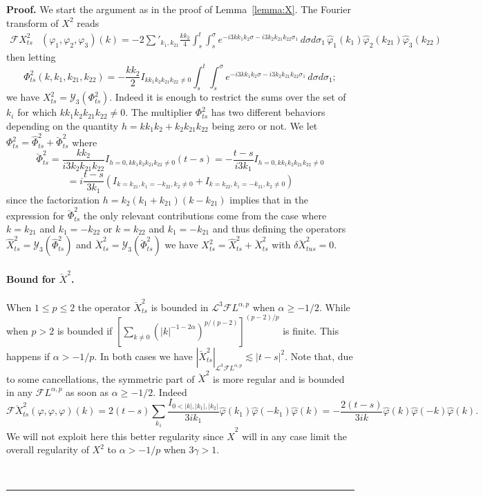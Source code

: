 \documentclass[a4paper,11pt,reqno]{article}
\newcommand{\der}{\delta}
\newcommand{\FF}{\mathcal{F}}
\newcommand{\LL}{\mathcal{L}}
\newcommand{\YY}{\mathcal{Y}}
\newcommand{\wh}{\widehat}
\newenvironment{proof}[1][Proof]{\textbf{#1.} }{\ \rule{0.5em}{0.5em}}
\begin{document}
\begin{proof}
We start the argument  as in the proof of Lemma~\ref{lemma:X}. The Fourier transform of $X^2$ reads
\begin{equation*}
  \begin{split}
\FF X^2_{ts}&(\varphi_1,\varphi_2,\varphi_3)(k) 
 =
- 2 \sum'_{k_1,k_{21}}  \frac{k k_2}4  \int_s^t  \int_s^\sigma e^{-i 3
  k k_1 k_2 \sigma
- i 3 k_2 k_{21} k_{22} \sigma_1}
 \, d\sigma   d\sigma_1\, \wh \varphi_1(k_1)  \wh \varphi_2(k_{21})  \wh \varphi_3(k_{22})  
 \end{split}
\end{equation*}
then letting
$$
\Phi_{ts}^2(k,k_1,k_{21},k_{22}) = -   \frac{k k_2}2 I_{k k_1 k_2  k_{21} k_{22}\neq 0} \int_s^t  \int_s^\sigma e^{-i 3
  k k_1 k_2 \sigma
- i 3 k_2 k_{21} k_{22} \sigma_1} 
 \, d\sigma   d\sigma_1  ;
$$  
we have $X_{ts}^2 =\YY_3(\Phi_{ts}^2)$. Indeed
 it is enough to restrict the sums over the set of $k_i$ for  which $k k_1 k_2  k_{21} k_{22}\neq 0$.
The multiplier $\Phi^2_{ts}$
has two different behaviors depending on the quantity $h = k k_1 k_2 + k_2 k_{21} k_{22}$ being zero or not. We let $\Phi^2_{ts} = \hat\Phi^2_{ts}+  \breve \Phi^2_{ts}$ where 
$$
\breve \Phi^2_{ts} = \frac{k k_2}{i 3 k_2 k_{21} k_{22}} I_{h=0,k k_1 k_2  k_{21} k_{22}\neq 0} (t-s) = - \frac{t-s}{i 3 k_1} I_{h=0,k k_1 k_2  k_{21} k_{22}\neq 0} 
$$
$$
 = i \frac{t-s}{3 k_1} (I_{k=k_{21},k_1=-k_{22},k_2 \neq 0}+I_{k=k_{22},k_1=-k_{21},k_2 \neq 0})
$$
since the factorization $h=k_2(k_1+k_{21})(k-k_{21})$ implies that in the expression for $\breve \Phi^2_{ts}$ the only relevant contributions come from the case where $k=k_{21}$ and $k_1=-k_{22}$ or $k=k_{22}$ and $k_1 =-k_{21}$ and thus defining the
operators $\hat X^2_{ts}=\YY_3(\hat\Phi^2_{ts})$ and $\breve X^2_{ts}=\YY_3(\breve\Phi^2_{ts})$ we have $X^2_{ts} = \hat X^2_{ts}+\breve X^2_{ts}$ with  $\der \breve X^{2}_{tus} = 0$.

\paragraph{Bound for $\breve X^2$.}
When $1 \le p \le 2$ the operator $\breve X^2_{ts}$ is bounded in $\LL^3 \FF L^{\alpha,p}$ when $\alpha \ge -1/2$.
While when $p> 2$ is bounded  if 
$
[\sum_{k\neq 0} (|k|^{-1-2\alpha})^{p/(p-2)}]^{(p-2)/p}
$ is finite. This happens if $\alpha >-1/p$. In both cases we have $|\breve X^2_{ts}|_{\LL^3 \FF L^{\alpha,p}} \lesssim |t-s|^2$. Note that, due to some cancellations, the symmetric part of $\breve X^2$ is more regular and is bounded in any $\FF L^{\alpha,p}$ as soon as $\alpha \ge -1/2$. Indeed
\begin{equation}
\label{eq:cancellation-breve-X2}
\FF
\breve X^{2}_{ts}(\varphi, \varphi, \varphi)(k) = 2 (t-s) \sum_{k_1} \frac{ I_{0<|k|,|k_1|,|k_2|}}{3 i k_1} \wh \varphi (k_1) \wh \varphi (-k_1) \wh \varphi (k)
= -  \frac{2 (t-s) }{3 i k} \wh \varphi (k) \wh \varphi (-k) \wh \varphi (k).
\end{equation}
 We will not exploit here this better regularity since $\hat X^2$ will in any case limit the overall regularity of $X^2$ to $\alpha > -1/p$ when $3\gamma > 1$.


\end{proof}
\end{document}
